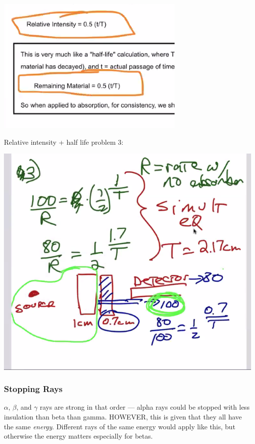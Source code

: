 \documentclass[letterpaper]{article}
\begin{document}
\begin{center}
\includegraphics[width=.9\linewidth]{halflife.png}
\end{center}

Relative intensity + half life problem 3:

\begin{center}
\includegraphics[width=.9\linewidth]{halflifeproctice.png}
\end{center}

\subsubsection{Stopping Rays}
\label{sec:orgb358b9d}
\(\alpha\), \(\beta\), and \(\gamma\) rays are strong in that order ---
alpha rays could be stopped with less insulation than beta than gamma.
HOWEVER, this is given that they all have the same \emph{energy}. Different
rays of the same energy would apply like this, but otherwise the energy
matters especially for betas.
\end{document}
